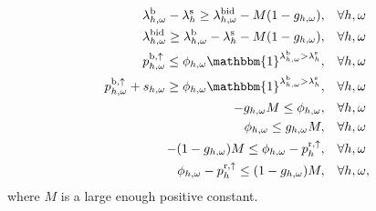 \begin{subequations}\label{eq:bid_constraint_relaxed}
    \begin{align}
        \lambda_{h,\omega}^{\rm{b}} - \lambda_{h}^{\rm{s}} \geq \lambda_{h,\omega}^{\rm{bid}} - M  (1 - g_{h,\omega}) , \quad                                   & \forall{h,\omega}             \label{con_bid:subeq1} \\
        \lambda_{h,\omega}^{\rm{bid}} \geq \lambda_{h,\omega}^{\rm{b}} - \lambda_{h}^{\rm{s}} - M  (1 - g_{h,\omega}) , \quad                                   & \forall{h,\omega}             \label{con_bid:subeq2} \\
        p^{\rm{b}, \uparrow}_{h,\omega} \leq \phi_{h,\omega}  \mathbbm{1}^{\lambda^{\rm{b}}_{h,\omega} > \lambda^{\rm{s}}_{h}}, \quad                & \forall{{h,\omega}}           \label{con_bid:subeq3} \\
        p^{\rm{b}, \uparrow}_{h,\omega} + s_{h,\omega} \geq \phi_{h,\omega}  \mathbbm{1}^{\lambda^{\rm{b}}_{h,\omega} > \lambda^{\rm{s}}_{h}}, \quad & \forall{{h,\omega}}           \label{con_bid:subeq4} \\
        -g_{h,\omega}  M \leq \phi_{h,\omega}, \quad                                                                                             & \forall{h,\omega}             \label{con_bid:subeq5} \\
        \phi_{h,\omega} \leq g_{h,\omega}  M, \quad                                                                                              & \forall{h,\omega}             \label{con_bid:subeq6} \\
        -(1 - g_{h,\omega})  M \leq \phi_{h,\omega} - p^{\rm{r},\uparrow}_{h}, \quad                                                                  & \forall{h,\omega}             \label{con_bid:subeq7} \\
        \phi_{h,\omega} - p^{\rm{r},\uparrow}_{h} \leq (1 - g_{h,\omega})  M, \quad                                                                   & \forall{h,\omega},             \label{con_bid:subeq8}
    \end{align}
\end{subequations}
where $M$ is a large enough positive constant. 
